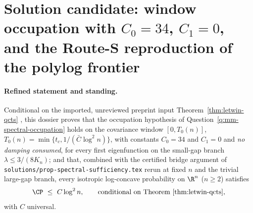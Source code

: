 \documentclass[../main.tex]{subfiles}
\begin{document}
%
\section*{Solution candidate: window occupation with $C_0=34$, $C_1=0$, and the
Route-S reproduction of the polylog frontier}
\label{sec:sol-prop-mm-window-occupation}

\paragraph{Refined statement and standing.}
Conditional on the imported, unreviewed preprint input Theorem~\ref{thm:letwin-qcts}
\cite[Thm.~1.2]{Letwin2026QuadraticKLS}, this dossier proves that the occupation
hypothesis of Question~\ref{q:mm-spectral-occupation} holds on the covariance window
$[0,T_0(n)]$, $T_0(n)=\min\{t_c,1/(\bar C\log^2n)\}$, with constants $C_0=34$ and
$C_1=0$ and \emph{no damping consumed}, for every first eigenfunction on the small-gap
branch $\lambda\le3/(8K_n)$; and that, combined with the certified bridge argument of
\texttt{solutions/prop-spectral-sufficiency.tex} rerun at fixed $n$ and the trivial
large-gap branch, every isotropic log-concave probability on $\R^n$ ($n\ge2$) satisfies
\[
  \CP\ \le\ C\log^2n,
  \qquad\text{conditional on Theorem~\ref{thm:letwin-qcts}},
\]
with $C$ universal.
\end{document}
